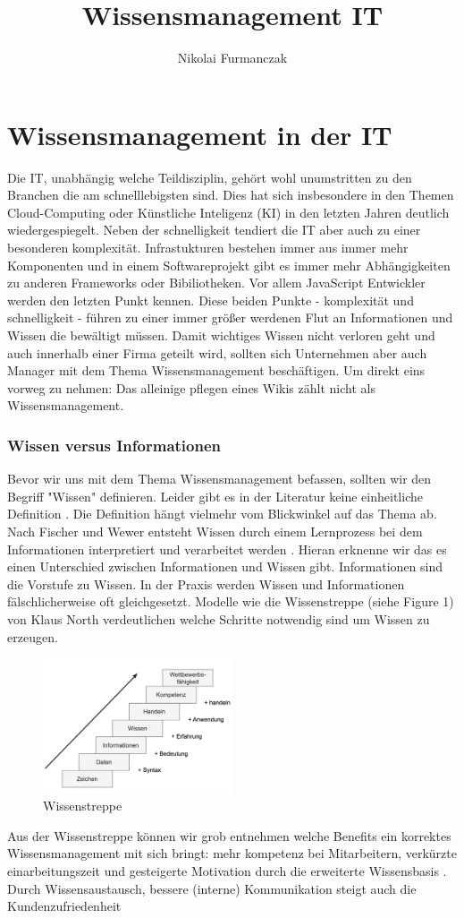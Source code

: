 \documentclass{article}
\title{Wissensmanagement IT}
\author{Nikolai Furmanczak}
\begin{document}
\section*{Wissensmanagement in der IT}
Die IT, unabhängig welche Teildisziplin, gehört wohl unumstritten zu den Branchen die am schnelllebigsten sind. Dies hat sich insbesondere in den Themen Cloud-Computing oder Künstliche Inteligenz (KI) in den letzten Jahren deutlich wiedergespiegelt. Neben der schnelligkeit tendiert die IT aber auch zu einer besonderen komplexität. Infrastukturen bestehen immer aus immer mehr Komponenten und in einem Softwareprojekt gibt es immer mehr Abhängigkeiten zu anderen Frameworks oder Bibiliotheken. Vor allem JavaScript Entwickler werden den letzten Punkt kennen. Diese beiden Punkte - komplexität und schnelligkeit - führen zu einer immer größer werdenen Flut an Informationen und Wissen die  bewältigt müssen. Damit wichtiges Wissen nicht verloren geht und auch innerhalb einer Firma geteilt wird, sollten sich Unternehmen aber auch Manager mit dem Thema Wissensmanagement beschäftigen. Um direkt eins vorweg zu nehmen: Das alleinige pflegen eines Wikis zählt nicht als Wissensmanagement.
\subsubsection*{Wissen versus Informationen}
Bevor wir uns mit dem Thema Wissensmanagement befassen, sollten wir den Begriff "Wissen" definieren. Leider gibt es in der Literatur keine einheitliche Definition \parencite{ReinmannRothmeierMandl2000}. Die Definition hängt vielmehr vom Blickwinkel auf das Thema ab. Nach Fischer und Wewer entsteht Wissen durch einem Lernprozess bei dem Informationen interpretiert und verarbeitet werden \parencite*[p. 2]{FischerWewer2021}. Hieran erknenne wir das es einen Unterschied zwischen Informationen und Wissen gibt. Informationen sind die Vorstufe zu Wissen. In der Praxis werden Wissen und Informationen fälschlicherweise oft gleichgesetzt. Modelle wie die Wissenstreppe (siehe Figure 1) von Klaus North verdeutlichen welche Schritte notwendig sind um Wissen zu erzeugen.   
\begin{figure}
    \centering
    \includegraphics[width=0.5\textwidth]{images/wissenstreppe.png}
    \caption{Wissenstreppe}
    \label{fig:meinBild}
  \end{figure}
Aus der Wissenstreppe können wir grob entnehmen welche Benefits ein korrektes Wissensmanagement mit sich bringt: mehr kompetenz bei Mitarbeitern, verkürzte einarbeitungszeit und gesteigerte Motivation durch die erweiterte Wissensbasis \parencite{NorthSchmidt2004}. Durch Wissensaustausch, bessere (interne) Kommunikation steigt auch die Kundenzufriedenheit \parencite{NorthSchmidt2004}
\end{document}
